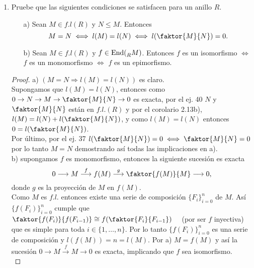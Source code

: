 \documentclass{article}
\begin{document}
\begin{enumerate}[label=\textbf{Ej \arabic*.}]
\begin{proof}
			Ahora, dado que $f$ es un monomorfismo, se tiene que $B_{t} \cong A_{t}$, para $t \leq n$. Y por otro lado, el teorema de la correspondencia y el tercer teorema de isomorfismo garantizan que $\displaystyle\frac{B_{t+1}}{B_{t}} = \displaystyle\frac{g^{-1}(C_{t+1})}{g^{-1}(C_{t})} \cong \displaystyle\frac{C_{t-n+1}}{C_{t-n}}$ para cada $n+1 \leq t \leq n+m$. Más aún, tenemos que los cocientes $\displaystyle\frac{B_{t+1}}{B_{t}}$ son simples, toda vez que los cocientes $\displaystyle\frac{A_{i+1}}{A_{i}}$ y $\displaystyle\frac{C_{j+1}}{C_{j}}$ lo son. De esta forma $\mathfrak{B}$ es una serie de composición para $B$. $\therefore B \in f.l.\lrprth{R}$
		\end{proof}
		
		
		\item Pruebe que las siguientes condiciones se satisfacen para un anillo $R$.\\
		\begin{itemize}
			\item[a)] Sean $M\in f.l(R)$ y $N\leq M$. Entonces 
			\[M=N\iff l(M)=l(N)\iff l(\faktor{M}{N})=0.\]
			\item[b)] Sean $M\in f.l(R)$ y $f\in \operatorname{End}(\prescript{}{R}{M})$. Entonces $f$ es un isomorfismo $\iff$ $f$ es un 
			monomorfismo $\iff$ $f$ es un epimorfismo.
		\end{itemize}
		\begin{proof}
			a) $\left(M=N\Rightarrow l(M)=l(N)\right)$ es claro.\\
			Supongamos que $l(M)=l(N)$, entonces como $0\to N\to M\to \faktor{M}{N}\to 0$ es exacta, por el ej. 40 $N$ y $\faktor{M}{N}$ están en $f.l.(R)$
			y por el corolario 2.13b), $l(M)=l(N)+l(\faktor{M}{N})$, y como $l(M)=l(N)$ entonces $0=l(\faktor{M}{N})$.\\
			Por último, por el ej. 37      $l(\faktor{M}{N})=0\iff \faktor{M}{N}=0$ por lo tanto $M=N$ demostrando así  todas las implicaciones en a).\\
			
			b) supongamos $f$ es monomorfismo, entonces la siguiente sucesión es exacta 
			\[0\longrightarrow M \stackrel{f}{\longrightarrow} f(M) \stackrel{g}{\longrightarrow} \faktor{f(M)}{M}\longrightarrow 0,\]
			donde $g$ es la proyección de $M$ en $f(M)$.\\
			
			Como $M$ es $f.l.$ entonces existe una serie de composición $\{F_i\}_{i=0}^n$ de $M$. Así $\{f(F_i)\}_{i=0}^n$ cumple que \quad
			$\faktor{f(F_i)}{f(F_{i-1})}\cong f(\faktor{F_i}{F_{i-1}})\quad$ (por ser $f$ inyectiva) que es simple para toda $i\in \{1,\ldots, n\}$.
			Por lo tanto $\{f(F_i)\}_{i=0}^n$ es una serie de composición y $l(f(M))=n=l(M)$. Por a) $M=f(M)$ y así la sucesión 
			$0\longrightarrow M \stackrel{f}{\longrightarrow} M\longrightarrow 0 $ es exacta, implicando que $f$ sea isomorfismo.\\
			

\end{proof}
\end{enumerate}
\end{document}
